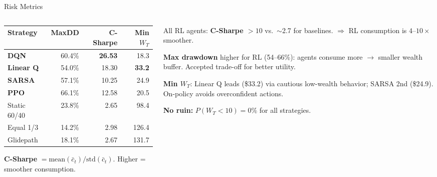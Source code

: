 \documentclass[aspectratio=169, 11pt]{beamer}
\begin{document}
\begin{frame}{Risk Metrics}
\begin{columns}[T]
\begin{column}{0.48\textwidth}
\begin{center}
\begin{tabular}{l r r r}
\toprule
\textbf{Strategy} & \textbf{MaxDD} & \textbf{C-Sharpe} & \textbf{Min $W_T$} \\
\midrule
\textbf{DQN}      & 60.4\% & \textbf{26.53} & 18.3 \\
\textbf{Linear Q} & 54.0\% & 18.30         & \textbf{33.2} \\
\textbf{SARSA}    & 57.1\% & 10.25         & 24.9 \\
\textbf{PPO}      & 66.1\% & 12.58         & 20.5 \\
\midrule
Static 60/40      & 23.8\% & 2.65          & 98.4 \\
Equal 1/3         & 14.2\% & 2.98          & 126.4 \\
Glidepath         & 18.1\% & 2.67          & 131.7 \\
\bottomrule
\end{tabular}
\end{center}

\vspace{0.2em}
\textbf{C-Sharpe} $= \text{mean}(\bar{c}_t) / \text{std}(\bar{c}_t)$. Higher = smoother consumption.
\end{column}
\begin{column}{0.48\textwidth}
All RL agents: \textbf{C-Sharpe $> 10$} vs.\ $\sim$2.7 for baselines.
$\Rightarrow$ RL consumption is $4$--$10\times$ smoother.

\vspace{0.3em}
\textbf{Max drawdown} higher for RL (54--66\%): agents consume more $\to$ smaller wealth buffer. Accepted trade-off for better utility.

\vspace{0.3em}
\textbf{Min $W_T$}: Linear Q leads (\$33.2) via cautious low-wealth behavior; SARSA 2nd (\$24.9). On-policy avoids overconfident actions.

\vspace{0.3em}
\textbf{No ruin:} $P(W_T < 10) = 0\%$ for all strategies.
\end{column}
\end{columns}
\end{frame}
\end{document}
